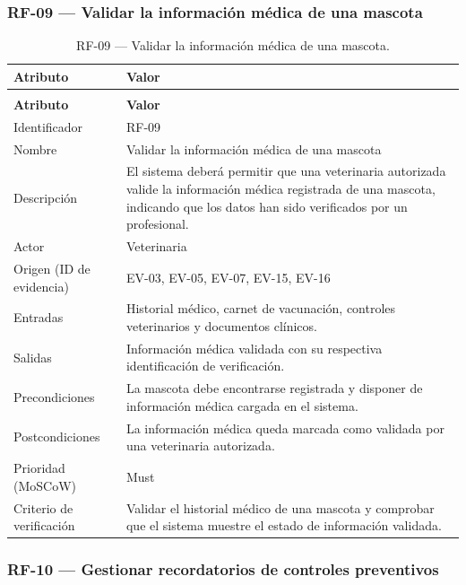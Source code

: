 \documentclass[journal,onecolumn]{IEEEtran}
\makeatletter
\newenvironment{atributos}[2]{%
	\small
	\begin{longtable}{@{}>{\raggedright\arraybackslash}p{4.2cm} >{\raggedright\arraybackslash}p{11.2cm}@{}}
		\caption{#2}\label{tab:#1}\\
		\toprule
		\textbf{Atributo} & \textbf{Valor} \\
		\midrule
		\endfirsthead
		\multicolumn{2}{@{}l}{\small\itshape (continuación)}\\
		\toprule
		\textbf{Atributo} & \textbf{Valor} \\
		\midrule
		\endhead
		\bottomrule
		\endlastfoot
	}{%
	\end{longtable}
	\normalsize
}
\makeatother
\begin{document}
	\subsubsection{RF-09 --- Validar la información médica de una mascota}
	
	\begin{atributos}{RF-09}{RF-09 --- Validar la información médica de una mascota.}
		Identificador & RF-09 \\
		Nombre & Validar la información médica de una mascota \\
		Descripción & El sistema deberá permitir que una veterinaria autorizada valide la información médica registrada de una mascota, indicando que los datos han sido verificados por un profesional. \\
		Actor & Veterinaria \\
		Origen (ID de evidencia) & EV-03, EV-05, EV-07, EV-15, EV-16 \\
		Entradas & Historial médico, carnet de vacunación, controles veterinarios y documentos clínicos. \\
		Salidas & Información médica validada con su respectiva identificación de verificación. \\
		Precondiciones & La mascota debe encontrarse registrada y disponer de información médica cargada en el sistema. \\
		Postcondiciones & La información médica queda marcada como validada por una veterinaria autorizada. \\
		Prioridad (MoSCoW) & Must \\
		Criterio de verificación & Validar el historial médico de una mascota y comprobar que el sistema muestre el estado de información validada. \\
	\end{atributos}
	
	\subsubsection{RF-10 --- Gestionar recordatorios de controles preventivos}
	
\end{document}

